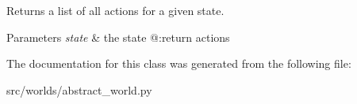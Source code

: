 Returns a list of all actions for a given state. 


\begin{DoxyParams}{Parameters}
{\em state} & the state @\+:return actions \\
\hline
\end{DoxyParams}


The documentation for this class was generated from the following file\+:\begin{DoxyCompactItemize}
\item 
src/worlds/abstract\+\_\+world.\+py\end{DoxyCompactItemize}
